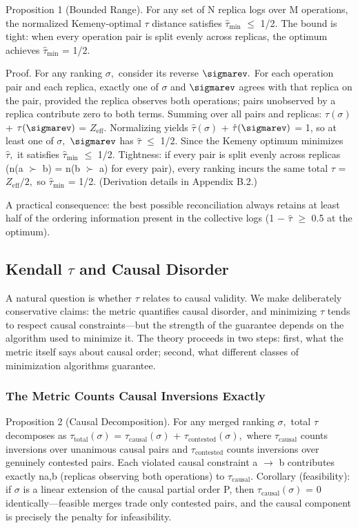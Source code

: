 \documentclass[journal]{IEEEtran}
\begin{document}
Proposition 1 (Bounded Range).  For any set of N replica logs over M operations, the normalized Kemeny-optimal $\tau$ distance satisfies $\hat{\tau}_{\mathrm{min}}$ $\leq$ 1/2. The bound is tight: when every operation pair is split evenly across replicas, the optimum achieves $\hat{\tau}_{\mathrm{min}}$ = 1/2.

Proof. For any ranking $\sigma,$ consider its reverse $\sigmarev.$ For each operation pair and each replica, exactly one of $\sigma$ and $\sigmarev$ agrees with that replica on the pair, provided the replica observes both operations; pairs unobserved by a replica contribute zero to both terms. Summing over all pairs and replicas: $\tau(\sigma)$ + $\tau(\sigmarev)$ = $Z_{\mathrm{eff}}.$ Normalizing yields $\hat{\tau}(\sigma)$ + $\hat{\tau}(\sigmarev)$ = 1, so at least one of $\sigma,$ $\sigmarev$ has $\hat{\tau}$ $\leq$ 1/2. Since the Kemeny optimum minimizes $\hat{\tau},$ it satisfies $\hat{\tau}_{\mathrm{min}}$ $\leq$ 1/2. Tightness: if every pair is split evenly across replicas (n(a $\succ$ b) = n(b $\succ$ a) for every pair), every ranking incurs the same total $\tau$ = $Z_{\mathrm{eff}}/2,$ so $\hat{\tau}_{\mathrm{min}}$ = 1/2. (Derivation details in Appendix B.2.)

A practical consequence: the best possible reconciliation always retains at least half of the ordering information present in the collective logs (1 $-$ $\hat{\tau}$ $\geq$ 0.5 at the optimum).

\subsection{Kendall $\tau$ and Causal Disorder}
A natural question is whether $\tau$ relates to causal validity. We make deliberately conservative claims: the metric quantifies causal disorder, and minimizing $\tau$ tends to respect causal constraints—but the strength of the guarantee depends on the algorithm used to minimize it. The theory proceeds in two steps: first, what the metric itself says about causal order; second, what different classes of minimization algorithms guarantee.

\subsubsection{The Metric Counts Causal Inversions Exactly}
Proposition 2 (Causal Decomposition).  For any merged ranking $\sigma,$ total $\tau$ decomposes as $\tau_{\mathrm{total}}(\sigma)$ = $\tau_{\mathrm{causal}}(\sigma)$ + $\tau_{\mathrm{contested}}(\sigma),$ where $\tau_{\mathrm{causal}}$ counts inversions over unanimous causal pairs and $\tau_{\mathrm{contested}}$ counts inversions over genuinely contested pairs. Each violated causal constraint a $\rightarrow$ b contributes exactly na,b (replicas observing both operations) to $\tau_{\mathrm{causal}}.$ Corollary (feasibility): if $\sigma$ is a linear extension of the causal partial order P, then $\tau_{\mathrm{causal}}(\sigma)$ = 0 identically—feasible merges trade only contested pairs, and the causal component is precisely the penalty for infeasibility.
\end{document}
